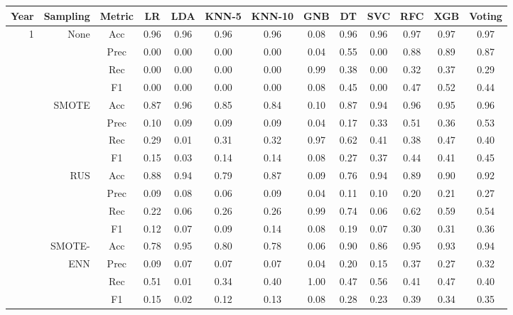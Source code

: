 \begin{table*}
\begin{narrow}{-1cm}{-1cm}
    \centering
    \begin{tabular}{r|r|c|cccccccccc}
       Year & Sampling & Metric & LR & LDA & KNN-5 & KNN-10 & GNB & DT & SVC & RFC & XGB & Voting \\
        \hline \hline
                        
1 & None & Acc & 0.96 & 0.96 & 0.96 & 0.96 & 0.08 & 0.96 & 0.96 & 0.97 & 0.97 & 0.97 \\
~ & ~ & Prec & 0.00 & 0.00 & 0.00 & 0.00 & 0.04 & 0.55 & 0.00 & 0.88 & 0.89 & 0.87 \\
~ & ~ & Rec & 0.00 & 0.00 & 0.00 & 0.00 & 0.99 & 0.38 & 0.00 & 0.32 & 0.37 & 0.29 \\
~ & ~ & F1 & 0.00 & 0.00 & 0.00 & 0.00 & 0.08 & 0.45 & 0.00 & 0.47 & 0.52 & 0.44 \\
\cline{2-13}
~ & SMOTE & Acc & 0.87 & 0.96 & 0.85 & 0.84 & 0.10 & 0.87 & 0.94 & 0.96 & 0.95 & 0.96 \\
~ & ~ & Prec & 0.10 & 0.09 & 0.09 & 0.09 & 0.04 & 0.17 & 0.33 & 0.51 & 0.36 & 0.53 \\
~ & ~ & Rec & 0.29 & 0.01 & 0.31 & 0.32 & 0.97 & 0.62 & 0.41 & 0.38 & 0.47 & 0.40 \\
~ & ~ & F1 & 0.15 & 0.03 & 0.14 & 0.14 & 0.08 & 0.27 & 0.37 & 0.44 & 0.41 & 0.45 \\
\cline{2-13}
~ & RUS & Acc & 0.88 & 0.94 & 0.79 & 0.87 & 0.09 & 0.76 & 0.94 & 0.89 & 0.90 & 0.92 \\
~ & ~ & Prec & 0.09 & 0.08 & 0.06 & 0.09 & 0.04 & 0.11 & 0.10 & 0.20 & 0.21 & 0.27 \\
~ & ~ & Rec & 0.22 & 0.06 & 0.26 & 0.26 & 0.99 & 0.74 & 0.06 & 0.62 & 0.59 & 0.54 \\
~ & ~ & F1 & 0.12 & 0.07 & 0.09 & 0.14 & 0.08 & 0.19 & 0.07 & 0.30 & 0.31 & 0.36 \\
\cline{2-13}
~ & SMOTE- & Acc & 0.78 & 0.95 & 0.80 & 0.78 & 0.06 & 0.90 & 0.86 & 0.95 & 0.93 & 0.94 \\
~ & ENN & Prec & 0.09 & 0.07 & 0.07 & 0.07 & 0.04 & 0.20 & 0.15 & 0.37 & 0.27 & 0.32 \\
~ & ~ & Rec & 0.51 & 0.01 & 0.34 & 0.40 & 1.00 & 0.47 & 0.56 & 0.41 & 0.47 & 0.40 \\
~ & ~ & F1 & 0.15 & 0.02 & 0.12 & 0.13 & 0.08 & 0.28 & 0.23 & 0.39 & 0.34 & 0.35 \\
\hline\hline


\end{tabular}
\end{narrow}
\end{table*}

